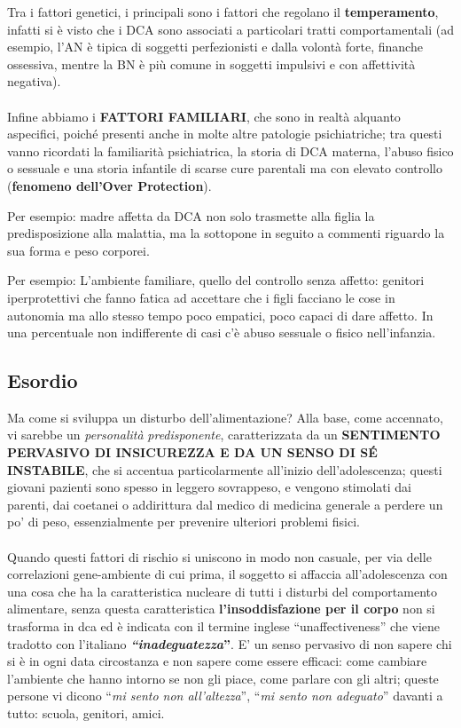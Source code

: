 Tra i fattori genetici, i principali sono i fattori che regolano il
\textbf{temperamento}, infatti si è visto che i DCA sono associati a
particolari tratti comportamentali (ad esempio, l'AN è tipica di
soggetti perfezionisti e dalla volontà forte, finanche ossessiva, mentre
la BN è più comune in soggetti impulsivi e con affettività negativa).
\\\\
Infine abbiamo i \textbf{FATTORI FAMILIARI}, che sono in realtà alquanto
aspecifici, poiché presenti anche in molte altre patologie
psichiatriche; tra questi vanno ricordati la familiarità psichiatrica,
la storia di DCA materna, l'abuso fisico o sessuale e una storia
infantile di scarse cure parentali ma con elevato controllo
(\textbf{fenomeno dell'Over Protection}).

Per esempio: madre affetta da DCA non solo trasmette alla figlia la
predisposizione alla malattia, ma la sottopone in seguito a commenti
riguardo la sua forma e peso corporei.

Per esempio: L'ambiente familiare, quello del controllo senza affetto:
genitori iperprotettivi che fanno fatica ad accettare che i figli
facciano le cose in autonomia ma allo stesso tempo poco empatici, poco
capaci di dare affetto. In una percentuale non indifferente di casi c'è
abuso sessuale o fisico nell'infanzia.

\subsection{Esordio}

Ma come si sviluppa un disturbo dell'alimentazione? Alla base, come
accennato, vi sarebbe un \emph{personalità} \emph{predisponente},
caratterizzata da un \textbf{SENTIMENTO PERVASIVO DI INSICUREZZA E DA UN
SENSO DI SÉ INSTABILE}, che si accentua particolarmente all'inizio
dell'adolescenza; questi giovani pazienti sono spesso in leggero
sovrappeso, e vengono stimolati dai parenti, dai coetanei o addirittura
dal medico di medicina generale a perdere un po' di peso, essenzialmente
per prevenire ulteriori problemi fisici.
\\\\
Quando questi fattori di rischio si uniscono in modo non casuale, per
via delle correlazioni gene-ambiente di cui prima, il soggetto si
affaccia all'adolescenza con una cosa che ha la caratteristica nucleare
di tutti i disturbi del comportamento alimentare, senza questa
caratteristica \textbf{l'insoddisfazione per il corpo} non si trasforma
in dca ed è indicata con il termine inglese ``unaffectiveness'' che
viene tradotto con l'italiano \textbf{\emph{\emph{``inadeguatezza}}''}.
E' un senso pervasivo di non sapere chi si è in ogni data circostanza e
non sapere come essere efficaci: come cambiare l'ambiente che hanno
intorno se non gli piace, come parlare con gli altri; queste persone vi
dicono ``\emph{mi sento non all'altezza}'', ``\emph{mi sento non
adeguato}'' davanti a tutto: scuola, genitori, amici.

